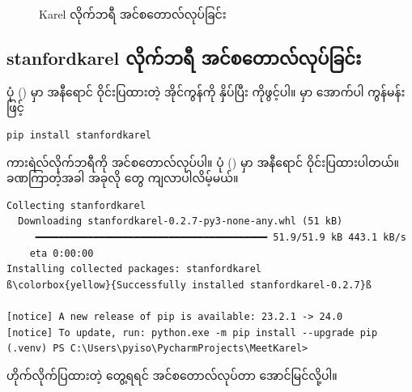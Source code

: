 \begin{figure}[tb!]
\caption{Karel လိုက်ဘရီ အင်စတောလ်လုပ်ခြင်း} 
\label{fig:install_karel}
\end{figure}

\subsection*{stanfordkarel လိုက်ဘရီ အင်စတောလ်လုပ်ခြင်း}
ပုံ (\fRefNo{\ref{fig:install_karel}}) မှာ အနီရောင် ဝိုင်းပြထားတဲ့ အိုင်ကွန်ကို နှိပ်ပြီး  ကိုဖွင့်ပါ။  မှာ အောက်ပါ ကွန်မန်းဖြင့် 
%
\begin{verbatim}
pip install stanfordkarel
\end{verbatim}
%
ကားရဲလ်လိုက်ဘရီကို အင်စတောလ်လုပ်ပါ။ ပုံ (\fRefNo{\ref{fig:install_karel}}) မှာ  အနီရောင် ဝိုင်းပြထားပါတယ်။ ခဏကြာတဲ့အခါ အခုလို တွေ ကျလာပါလိမ့်မယ်။ 

%
\begin{verbatim}
Collecting stanfordkarel
  Downloading stanfordkarel-0.2.7-py3-none-any.whl (51 kB)
     ━━━━━━━━━━━━━━━━━━━━━━━━━━━━━━━━━━━━━━━━ 51.9/51.9 kB 443.1 kB/s 
    eta 0:00:00
Installing collected packages: stanfordkarel
ß\colorbox{yellow}{Successfully installed stanfordkarel-0.2.7}ß

[notice] A new release of pip is available: 23.2.1 -> 24.0
[notice] To update, run: python.exe -m pip install --upgrade pip
(.venv) PS C:\Users\pyiso\PycharmProjects\MeetKarel>
\end{verbatim}
%
ဟိုက်လိုက်ပြထားတဲ့  တွေ့ရရင် အင်စတောလ်လုပ်တာ အောင်မြင်လို့ပါ။

